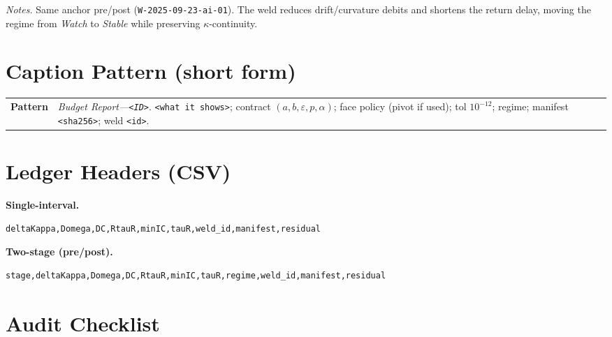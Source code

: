 \noindent\textit{Notes.} Same anchor pre/post (\texttt{W-2025-09-23-ai-01}). The weld reduces drift/curvature debits and shortens the return delay, moving the regime from \emph{Watch} to \emph{Stable} while preserving $\kappa$-continuity.

\section{Caption Pattern (short form)}
\label{sec:audits-caption}

\begin{eqbox}
\small
\begin{tabularx}{\linewidth}{@{}>{\bfseries}l X@{}}
Pattern &
\emph{Budget Report—\texttt{<ID>}}. \texttt{<what it shows>}; contract $(a,b,\varepsilon,p,\alpha)$; face policy (pivot if used); tol $10^{-12}$; regime; manifest \texttt{<sha256>}; weld \texttt{<id>}. \\
\end{tabularx}
\end{eqbox}

\section{Ledger Headers (CSV)}
\label{sec:audits-ledger-header}

\noindent\textbf{Single-interval.}
\begin{lstlisting}[style=umcpstyle, numbers=none, frame=single, basicstyle=\ttfamily\small]
deltaKappa,Domega,DC,RtauR,minIC,tauR,weld_id,manifest,residual
\end{lstlisting}

\noindent\textbf{Two-stage (pre/post).}
\begin{lstlisting}[style=umcpstyle, numbers=none, frame=single, basicstyle=\ttfamily\small]
stage,deltaKappa,Domega,DC,RtauR,minIC,tauR,regime,weld_id,manifest,residual
\end{lstlisting}

\section{Audit Checklist}
\label{sec:audits-checklist}

